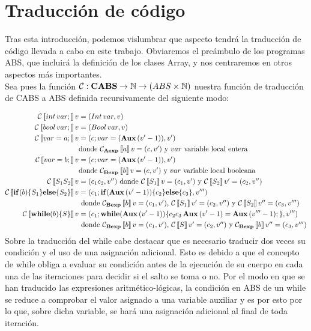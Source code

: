 \section{Traducción de código}

Tras esta introducción, podemos vislumbrar que aspecto tendrá la traducción de código llevada a cabo en este trabajo. Obviaremos el preámbulo de los programas ABS, que incluirá la definición de los clases Array, y nos centraremos en otros aspectos más importantes.\\

Sea pues la función $\mathcal{C}: \textbf{CABS} \rightarrow \mathbb{N} \rightarrow (ABS \times \mathbb{N})$ nuestra función de traducción de CABS a ABS definida recursivamente del siguiente modo:

\begin{align*}
  \mathcal{C}\left\llbracket int\, var\mbox{;\,} \right\rrbracket v &= (Int\, var, v) \\
  \mathcal{C}\left\llbracket bool\, var\mbox{;\,} \right\rrbracket v &= (Bool\, var, v) \\
  \mathcal{C}\left\llbracket var = a\mbox{;\,} \right\rrbracket v &= (c\mbox{;\,} var = (\textbf{Aux}\, (v' - 1)), v') \\
  & \mbox{donde $\mathcal{C}_{\textbf{Aexp}}\left\llbracket a \right\rrbracket v = (c, v')$ y $var$ variable local entera} \\
  \mathcal{C}\left\llbracket var = b\mbox{;\,} \right\rrbracket v &= (c\mbox{;\,} var = (\textbf{Aux}\, (v' - 1)), v') \\
  & \mbox{donde $\mathcal{C}_{\textbf{Bexp}}\left\llbracket b \right\rrbracket v = (c, v')$ y $var$ variable local booleana} \\
  \mathcal{C}\left\llbracket S_1 S_2 \right\rrbracket v &= (c_1 c_2, v'') \mbox{ donde $\mathcal{C}\left\llbracket S_1 \right\rrbracket v = (c_1, v')$ y $\mathcal{C}\left\llbracket S_2 \right\rrbracket v' = (c_2, v'')$} \\
  \mathcal{C}\left\llbracket \mbox{\textbf{if}} (b) \{S_1\} \mbox{\textbf{else}} \{S_2\} \right\rrbracket v &= (c_1\mbox{;\,} \mbox{\textbf{if}} (\textbf{Aux}\, (v' - 1)) \{c_2\} \mbox{\textbf{else}} \{c_3\}, v''') \\
  & \mbox{ donde $\mathcal{C}_{\textbf{Bexp}}\left\llbracket b \right\rrbracket v = (c_1, v')$, $\mathcal{C}\left\llbracket S_1 \right\rrbracket v' = (c_2, v'')$ y $\mathcal{C}\left\llbracket S_2 \right\rrbracket v'' = (c_3, v''')$} \\
  \mathcal{C}\left\llbracket \mbox{\textbf{while}} (b) \{S\} \right\rrbracket v &= (c_1\mbox{;\,} \mbox{\textbf{while}} (\textbf{Aux}\, (v' - 1)) \{c_2 c_3\, \textbf{Aux}\, (v' - 1) = \textbf{Aux}\, (v''' - 1)\mbox{;\,}\}, v''') \\
  & \mbox{ donde $\mathcal{C}_{\textbf{Bexp}}\left\llbracket b \right\rrbracket v = (c_1, v')$, $\mathcal{C}\left\llbracket S \right\rrbracket v' = (c_2, v'')$ y $\mathcal{C}_{\textbf{Bexp}}\left\llbracket b \right\rrbracket v'' = (c_3, v''')$}
\end{align*}
Sobre la traducción del while cabe destacar que es necesario traducir dos veces su condición y el uso de una asignación adicional. Esto es debido a que el concepto de while obliga a evaluar su condición antes de la ejecución de su cuerpo en cada una de las iteraciones para decidir si el salto se toma o no. Por el modo en que se han traducido las expresiones aritmético-lógicas, la condición en ABS de un while se reduce a comprobar el valor asignado a una variable auxiliar y es por esto por lo que, sobre dicha variable, se hará una asignación adicional al final de toda iteración.\\

